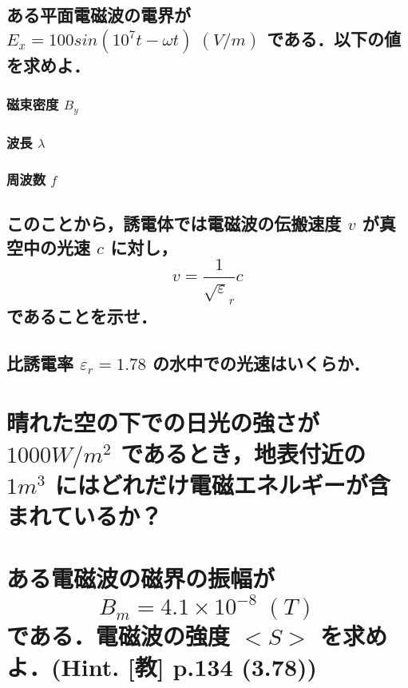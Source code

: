 \documentclass[a4paper, 11pt]{bxjsarticle}
\begin{document}
\begin{samepage}
\section{}
\subsection{ある平面電磁波の電界が \(E_x=100sin(10^7 t - \omega t)\;\si{(V/m)}\) である．以下の値を求めよ．}
\subsubsection{磁束密度 \(B_y\)}
\vspace*{7.5em}
\subsubsection{波長 \(\lambda\)}
\vspace*{7.5em}
\subsubsection{周波数 \(f\)}
\vspace*{7.5em}

\subsection{このことから，誘電体では電磁波の伝搬速度 \(v\) が真空中の光速 \(c\) に対し，\[v=\frac{1}{\sqrt \varepsilon_r} c\]であることを示せ．}
\vspace*{10em}
\subsection{比誘電率 \(\varepsilon_r = 1.78\) の水中での光速はいくらか．}
\end{samepage}
\newpage

\begin{samepage}
\section{晴れた空の下での日光の強さが \(1000\si{W/m^2}\) であるとき，地表付近の \(1\si{m^3}\) にはどれだけ電磁エネルギーが含まれているか？}
\vspace*{25em}
\section{ある電磁波の磁界の振幅が\[B_m = 4.1\times 10^{-8}\;\si{(T)}\]である．電磁波の強度 \(<S>\) を求めよ．(Hint. [教] p.134 (3.78))}
\end{samepage}
\end{document}
